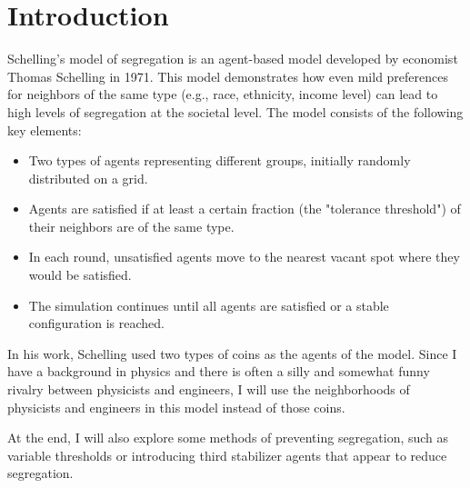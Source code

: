 \documentclass{article}
\begin{document}
\section{Introduction}

Schelling's model of segregation is an agent-based model developed by economist Thomas Schelling in 1971. This model demonstrates how even mild preferences for neighbors of the same type (e.g., race, ethnicity, income level) can lead to high levels of segregation at the societal level. The model consists of the following key elements:

\begin{itemize}
\item Two types of agents representing different groups, initially randomly distributed on a grid.
\item Agents are satisfied if at least a certain fraction (the "tolerance threshold") of their neighbors are of the same type.
\item In each round, unsatisfied agents move to the nearest vacant spot where they would be satisfied.
\item The simulation continues until all agents are satisfied or a stable configuration is reached.
\end{itemize}

In his work, Schelling used two types of coins as the agents of the model. Since I have a background in physics and there is often a silly and somewhat funny rivalry between physicists and engineers, I will use the neighborhoods of physicists and engineers in this model instead of those coins.

At the end, I will also explore some methods of preventing segregation, such as variable thresholds or introducing third stabilizer agents that appear to reduce segregation.
\end{document}
